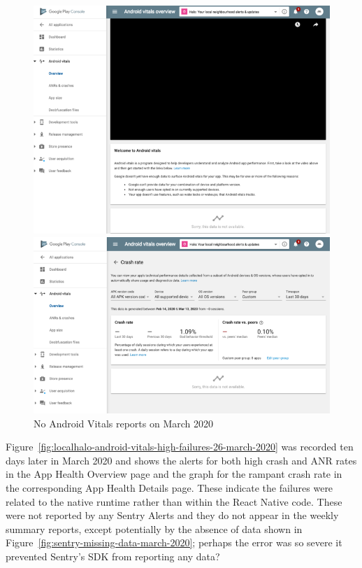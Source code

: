 \begin{figure}[htbp!]
\centering
\begin{minipage}{.45\textwidth}
  \centering
  \includegraphics[width=\textwidth]{images/localhalo/apphealthoverviewplace_5550596_no_data.png}
\end{minipage}\hfill%
\begin{minipage}{.45\textwidth}
  \centering
  \includegraphics[width=\textwidth]{images/localhalo/apphealthdetailsplace_55505963_no_data.png}
\end{minipage}
    \caption{No Android Vitals reports on  March 2020}
    \label{fig:localhalo-android-vitals-no-data-16-march-2020}
\end{figure}

Figure~\ref{fig:localhalo-android-vitals-high-failures-26-march-2020} was recorded ten days later in  March 2020 and shows the alerts for both high crash and ANR rates in the App Health Overview page and the graph for the rampant crash rate in the corresponding App Health Details page. These indicate the failures were related to the native runtime rather than within the React Native code. These were not reported by any Sentry Alerts and they do not appear in the weekly summary reports, except potentially by the absence of data shown in Figure~\ref{fig:sentry-missing-data-march-2020}; perhaps the error was so severe it prevented Sentry's SDK from reporting any data?

